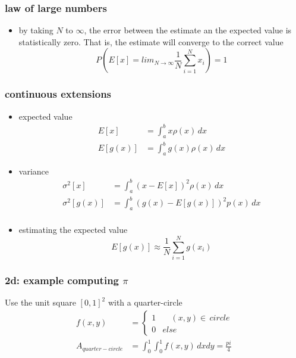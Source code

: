 \documentclass[10pt]{beamer}
\begin{document}
\begin{frame}
\frametitle{law of large numbers}
\begin{itemize}
  \item by taking $N$ to $\infty$, the error between the estimate an the
expected value is statistically zero.  That is, the estimate will
converge to the correct value
\begin{equation*} 
  P(E[x] = lim_{N\rightarrow\infty} \frac{1}{N} \sum_{i=1}^{N} x_i) = 1
\end{equation*}
\end{itemize}
\end{frame}
\begin{frame}
\frametitle{continuous extensions}
\begin{itemize}
  \item expected value
  \begin{align*}
  E[x] & = \int_a^b x\rho(x)\,dx\\
  E[g(x)] & = \int_a^b g(x)\rho(x)\,dx
  \end{align*}
  \item variance
  \begin{align*}
  \sigma^2[x] & = \int_a^b (x-E[x])^2\rho(x)\,dx\\
  \sigma^2[g(x)] & = \int_a^b (g(x)-E[g(x)])^2 p(x)\,dx\\
  \end{align*}
  \item estimating the expected value
  \begin{equation*}
    E[g(x)] \approx \frac{1}{N} \sum_{i=1}^{N} g(x_i)
\end{equation*}
\end{itemize}
\end{frame}
\begin{frame}
\frametitle{2d: example computing $\pi$}
Use the unit square $[0,1]^2$ with a quarter-circle
\begin{align*}
  f(x,y) & = 
\begin{cases}
1 & \quad (x,y)\in \, circle\\
0 & else
\end{cases}\\
  A_{quarter-circle} &= \int_0^1\int_0^1 f(x,y)\,dxdy = \frac{pi}{4}
\end{align*}
\begin{center}
\end{center}
\end{frame}
\end{document}
